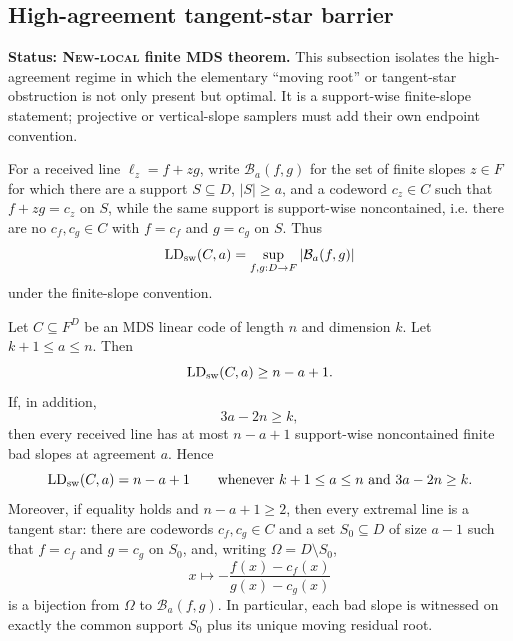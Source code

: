 \subsection{High-agreement tangent-star barrier}
\label{sec:tangent-star-barrier}

\textbf{Status: \textsc{New-local} finite MDS theorem.}
This subsection isolates the high-agreement regime in which the elementary
``moving root'' or tangent-star obstruction is not only present but optimal.
It is a support-wise finite-slope statement; projective or vertical-slope
samplers must add their own endpoint convention.

For a received line \(\ell_z=f+zg\), write \(\mathcal B_a(f,g)\) for the set
of finite slopes \(z\in F\) for which there are a support \(S\subseteq D\),
\(|S|\ge a\), and a codeword \(c_z\in C\) such that \(f+zg=c_z\) on \(S\),
while the same support is support-wise noncontained, i.e. there are no
\(c_f,c_g\in C\) with \(f=c_f\) and \(g=c_g\) on \(S\).  Thus
\[
  \operatorname{LD}_{\rm sw}(C,a)
  =\sup_{f,g:D\to F}|\mathcal B_a(f,g)|
\]
under the finite-slope convention.

\begin{theorem}
\label{thm:tangent-star-exact}
Let \(C\subseteq F^D\) be an MDS linear code of length \(n\) and dimension
\(k\).  Let \(k+1\le a\le n\).  Then
\[
  \operatorname{LD}_{\rm sw}(C,a)\ge n-a+1.
\]
If, in addition,
\[
  3a-2n\ge k,
\]
then every received line has at most \(n-a+1\) support-wise noncontained finite
bad slopes at agreement \(a\).  Hence
\[
  \operatorname{LD}_{\rm sw}(C,a)=n-a+1
  \qquad\text{whenever }k+1\le a\le n\text{ and }3a-2n\ge k.
\]
Moreover, if equality holds and \(n-a+1\ge2\), then every extremal line is a
tangent star: there are codewords \(c_f,c_g\in C\) and a set
\(S_0\subseteq D\) of size \(a-1\) such that \(f=c_f\) and \(g=c_g\) on
\(S_0\), and, writing \(\Omega=D\setminus S_0\),
\[
  x\longmapsto
  -\frac{f(x)-c_f(x)}{g(x)-c_g(x)}
\]
 is a bijection from \(\Omega\) to \(\mathcal B_a(f,g)\).  In particular, each
bad slope is witnessed on exactly the common support \(S_0\) plus its unique
moving residual root.
\end{theorem}

